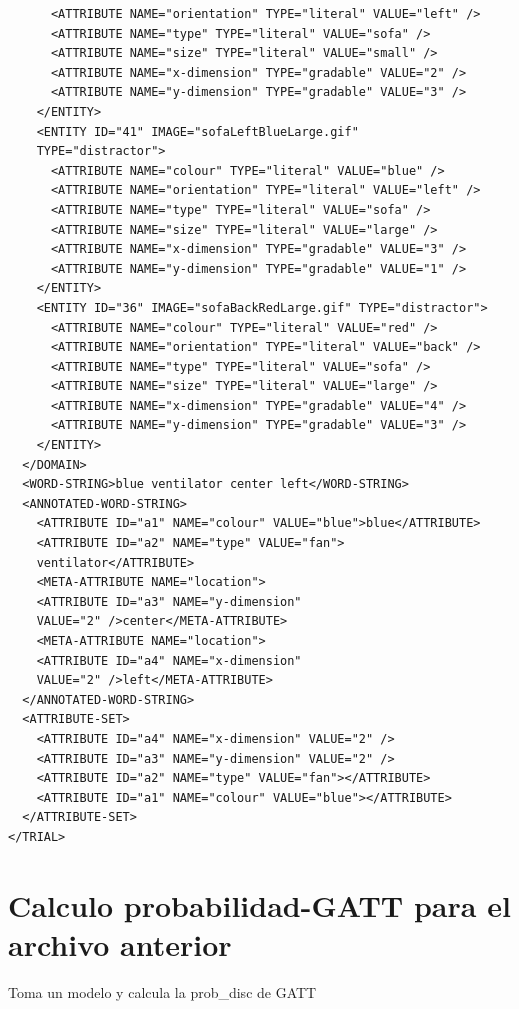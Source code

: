 \begin{verbatim}
      <ATTRIBUTE NAME="orientation" TYPE="literal" VALUE="left" />
      <ATTRIBUTE NAME="type" TYPE="literal" VALUE="sofa" />
      <ATTRIBUTE NAME="size" TYPE="literal" VALUE="small" />
      <ATTRIBUTE NAME="x-dimension" TYPE="gradable" VALUE="2" />
      <ATTRIBUTE NAME="y-dimension" TYPE="gradable" VALUE="3" />
    </ENTITY>
    <ENTITY ID="41" IMAGE="sofaLeftBlueLarge.gif"
    TYPE="distractor">
      <ATTRIBUTE NAME="colour" TYPE="literal" VALUE="blue" />
      <ATTRIBUTE NAME="orientation" TYPE="literal" VALUE="left" />
      <ATTRIBUTE NAME="type" TYPE="literal" VALUE="sofa" />
      <ATTRIBUTE NAME="size" TYPE="literal" VALUE="large" />
      <ATTRIBUTE NAME="x-dimension" TYPE="gradable" VALUE="3" />
      <ATTRIBUTE NAME="y-dimension" TYPE="gradable" VALUE="1" />
    </ENTITY>
    <ENTITY ID="36" IMAGE="sofaBackRedLarge.gif" TYPE="distractor">
      <ATTRIBUTE NAME="colour" TYPE="literal" VALUE="red" />
      <ATTRIBUTE NAME="orientation" TYPE="literal" VALUE="back" />
      <ATTRIBUTE NAME="type" TYPE="literal" VALUE="sofa" />
      <ATTRIBUTE NAME="size" TYPE="literal" VALUE="large" />
      <ATTRIBUTE NAME="x-dimension" TYPE="gradable" VALUE="4" />
      <ATTRIBUTE NAME="y-dimension" TYPE="gradable" VALUE="3" />
    </ENTITY>
  </DOMAIN>
  <WORD-STRING>blue ventilator center left</WORD-STRING>
  <ANNOTATED-WORD-STRING>
    <ATTRIBUTE ID="a1" NAME="colour" VALUE="blue">blue</ATTRIBUTE>
    <ATTRIBUTE ID="a2" NAME="type" VALUE="fan">
    ventilator</ATTRIBUTE>
    <META-ATTRIBUTE NAME="location">
    <ATTRIBUTE ID="a3" NAME="y-dimension"
    VALUE="2" />center</META-ATTRIBUTE>
    <META-ATTRIBUTE NAME="location">
    <ATTRIBUTE ID="a4" NAME="x-dimension"
    VALUE="2" />left</META-ATTRIBUTE>
  </ANNOTATED-WORD-STRING>
  <ATTRIBUTE-SET>
    <ATTRIBUTE ID="a4" NAME="x-dimension" VALUE="2" />
    <ATTRIBUTE ID="a3" NAME="y-dimension" VALUE="2" />
    <ATTRIBUTE ID="a2" NAME="type" VALUE="fan"></ATTRIBUTE>
    <ATTRIBUTE ID="a1" NAME="colour" VALUE="blue"></ATTRIBUTE>
  </ATTRIBUTE-SET>
</TRIAL>
\end{verbatim}


\section{Calculo probabilidad-GATT para el archivo anterior}

Toma un modelo y calcula la prob\_disc de GATT 

